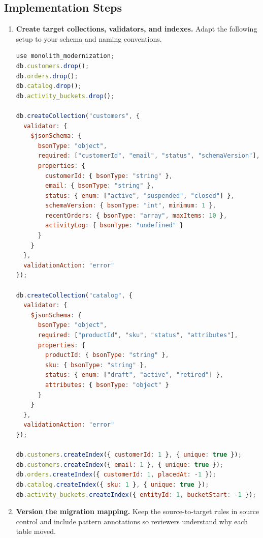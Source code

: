 \subsection*{Implementation Steps}
\begin{enumerate}
    \item \textbf{Create target collections, validators, and indexes.} Adapt the following setup to your schema and naming conventions.

\begin{lstlisting}[language=JavaScript, caption={\texttt{mongosh} setup for capstone document collections with Attribute, Bucket, and Subset Patterns.}]
use monolith_modernization;
db.customers.drop();
db.orders.drop();
db.catalog.drop();
db.activity_buckets.drop();

db.createCollection("customers", {
  validator: {
    $jsonSchema: {
      bsonType: "object",
      required: ["customerId", "email", "status", "schemaVersion"],
      properties: {
        customerId: { bsonType: "string" },
        email: { bsonType: "string" },
        status: { enum: ["active", "suspended", "closed"] },
        schemaVersion: { bsonType: "int", minimum: 1 },
        recentOrders: { bsonType: "array", maxItems: 10 },
        activityLog: { bsonType: "undefined" }
      }
    }
  },
  validationAction: "error"
});

db.createCollection("catalog", {
  validator: {
    $jsonSchema: {
      bsonType: "object",
      required: ["productId", "sku", "status", "attributes"],
      properties: {
        productId: { bsonType: "string" },
        sku: { bsonType: "string" },
        status: { enum: ["draft", "active", "retired"] },
        attributes: { bsonType: "object" }
      }
    }
  },
  validationAction: "error"
});

db.customers.createIndex({ customerId: 1 }, { unique: true });
db.customers.createIndex({ email: 1 }, { unique: true });
db.orders.createIndex({ customerId: 1, placedAt: -1 });
db.catalog.createIndex({ sku: 1 }, { unique: true });
db.activity_buckets.createIndex({ entityId: 1, bucketStart: -1 });
\end{lstlisting}

    \item \textbf{Version the migration mapping.} Keep the source-to-target rules in source control and include pattern annotations so reviewers understand why each table moved.


\end{enumerate}
